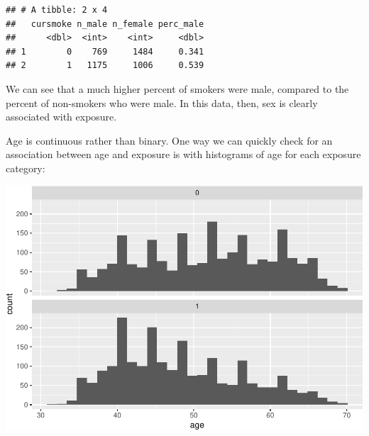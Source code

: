 \documentclass[
]{book}
\newenvironment{Shaded}{\begin{snugshade}}{\end{snugshade}}
\newcommand{\DataTypeTok}[1]{\textcolor[rgb]{0.13,0.29,0.53}{#1}}
\newcommand{\DecValTok}[1]{\textcolor[rgb]{0.00,0.00,0.81}{#1}}
\newcommand{\KeywordTok}[1]{\textcolor[rgb]{0.13,0.29,0.53}{\textbf{#1}}}
\newcommand{\NormalTok}[1]{#1}
\newcommand{\OperatorTok}[1]{\textcolor[rgb]{0.81,0.36,0.00}{\textbf{#1}}}
\newcommand{\StringTok}[1]{\textcolor[rgb]{0.31,0.60,0.02}{#1}}
\begin{document}
\begin{Shaded}
\end{Shaded}

\begin{verbatim}
## # A tibble: 2 x 4
##   cursmoke n_male n_female perc_male
##      <dbl>  <int>    <int>     <dbl>
## 1        0    769     1484     0.341
## 2        1   1175     1006     0.539
\end{verbatim}

We can see that a much higher percent of smokers were male, compared to the percent of non-smokers who were male. In this data, then, sex is clearly associated with exposure.

Age is continuous rather than binary. One way we can quickly check for an association between age and exposure is with histograms of age for each exposure category:

\begin{Shaded}
\end{Shaded}

\includegraphics{adv_epi_analysis_files/figure-latex/unnamed-chunk-253-1.pdf}
\end{document}

